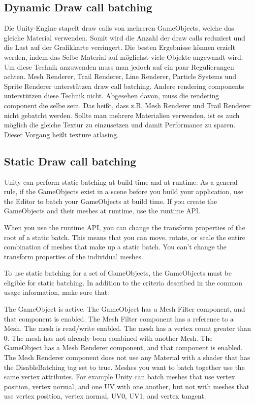 \subsection{Dynamic Draw call batching}
Die Unity-Engine stapelt draw calls von mehreren GameObjects, welche das gleiche Material verwenden. Somit wird die Anzahl der draw calls reduziert und die Last auf der Grafikkarte verringert. Die besten Ergebnisse können erzielt werden, indem das Selbe Material auf möglichst viele Objekte angewandt wird. Um diese Technik anzuwenden muss man jedoch auf ein paar Regulierungen achten. Mesh Renderer, Trail Renderer, Line Renderer, Particle Systems und Sprite Renderer unterstützen draw call batching. Andere rendering components unterstützen diese Technik nicht. Abgesehen davon, muss die rendering component die selbe sein. Das heißt, dass z.B. Mesh Renderer und Trail Renderer nicht gebatcht werden. Sollte man mehrere Materialien verwenden, ist es auch möglich die gleiche Textur zu einzusetzen und damit Performance zu sparen. Dieser Vorgang heißt texture atlasing.

\subsection{Static Draw call batching}
Unity can perform static batching at build time and at runtime. As a general rule, if the GameObjects
exist in a scene
before you build your application, use the Editor to batch your GameObjects at build time. If you create the GameObjects and their meshes at runtime, use the runtime API.

When you use the runtime API, you can change the transform properties of the root of a static batch. This means that you can move, rotate, or scale the entire combination of meshes that make up a static batch. You can’t change the transform properties of the individual meshes.

To use static batching for a set of GameObjects, the GameObjects must be eligible for static batching. In addition to the criteria described in the common usage information, make sure that:

The GameObject is active.
The GameObject has a Mesh Filter
component, and that component is enabled.
The Mesh Filter component has a reference to a Mesh.
The mesh is read/write enabled.
The mesh has a vertex count greater than 0.
The mesh has not already been combined with another Mesh.
The GameObject has a Mesh Renderer
component, and that component is enabled.
The Mesh Renderer component does not use any Material with a shader
that has the DisableBatching tag set to true.
Meshes you want to batch together use the same vertex attributes. For example Unity can batch meshes that use vertex position, vertex normal, and one UV with one another, but not with meshes that use vertex position, vertex normal, UV0, UV1, and vertex tangent.


